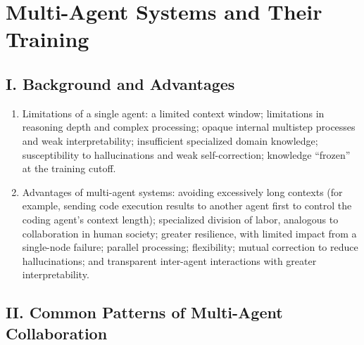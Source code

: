 \setcounter{section}{2}

\hypertarget{multi-agent-systems-and-their-training}{%
\section{Multi-Agent Systems and Their Training}\label{multi-agent-systems-and-their-training}}

\hypertarget{i.-background-and-advantages}{%
\subsection{I. Background and Advantages}\label{i.-background-and-advantages}}

\begin{enumerate}
\def\labelenumi{\arabic{enumi}.}
\item
  Limitations of a single agent: a limited context window; limitations in reasoning depth and complex processing; opaque internal multistep processes and weak interpretability; insufficient specialized domain knowledge; susceptibility to hallucinations and weak self-correction; knowledge ``frozen'' at the training cutoff.
\item
  Advantages of multi-agent systems: avoiding excessively long contexts (for example, sending code execution results to another agent first to control the coding agent's context length); specialized division of labor, analogous to collaboration in human society; greater resilience, with limited impact from a single-node failure; parallel processing; flexibility; mutual correction to reduce hallucinations; and transparent inter-agent interactions with greater interpretability.
\end{enumerate}

\hypertarget{ii.-common-patterns-of-multi-agent-collaboration}{%
\subsection{II. Common Patterns of Multi-Agent Collaboration}\label{ii.-common-patterns-of-multi-agent-collaboration}}

